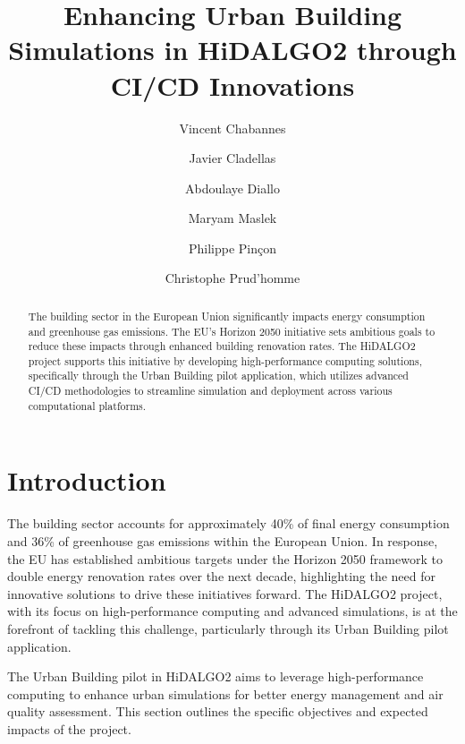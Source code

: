 \documentclass[runningheads]{llncs}
\begin{document}
\title{Enhancing Urban Building Simulations in HiDALGO2 through CI/CD Innovations}
\author{Vincent Chabannes  \and
Javier Cladellas \orcidID{} \and 
Abdoulaye Diallo \orcidID{} \and
Maryam Maslek \orcidID{} \and
Philippe Pinçon \orcidID{} \and
Christophe Prud'homme}


\maketitle

\begin{abstract}
The building sector in the European Union significantly impacts energy consumption and greenhouse gas emissions. The EU's Horizon 2050 initiative sets ambitious goals to reduce these impacts through enhanced building renovation rates. The HiDALGO2 project supports this initiative by developing high-performance computing solutions, specifically through the Urban Building pilot application, which utilizes advanced CI/CD methodologies to streamline simulation and deployment across various computational platforms.

\end{abstract}

\section{Introduction}
The building sector accounts for approximately 40\% of final energy consumption and 36\% of greenhouse gas emissions within the European Union. In response, the EU has established ambitious targets under the Horizon 2050 framework to double energy renovation rates over the next decade, highlighting the need for innovative solutions to drive these initiatives forward. The HiDALGO2 project, with its focus on high-performance computing and advanced simulations, is at the forefront of tackling this challenge, particularly through its Urban Building pilot application.

The Urban Building pilot in HiDALGO2 aims to leverage high-performance computing to enhance urban simulations for better energy management and air quality assessment. This section outlines the specific objectives and expected impacts of the project.
\end{document}
